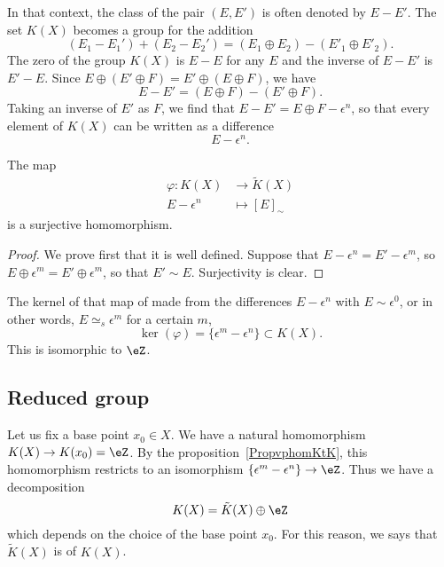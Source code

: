 In that context, the class of the pair $(E,E')$ is often denoted by $E-E'$. The set $K(X)$ becomes a group for the addition
\begin{equation}
(E_1-E_1')+(E_2-E_2')=(E_1\oplus E_2)-(E'_1\oplus E'_2).
\end{equation}
The zero of the group $K(X)$ is $E-E$ for any $E$ and the inverse of $E-E'$ is $E'-E$. Since $E\oplus(E'\oplus F)=E'\oplus(E\oplus F)$, we have
\begin{equation}
E-E'=(E\oplus F)-(E'\oplus F).
\end{equation}
Taking an inverse of $E'$ as $F$, we find that $E-E'=E\oplus F-\epsilon^n$, so that every element of $K(X)$ can be written as a difference
\[
E-\epsilon^n.
\]

\begin{proposition}		\label{PropvphomKtK}
The map
\begin{equation}
\begin{aligned}
 \varphi\colon K(X)&\to \tilde K(X) \\
   E-\epsilon^n&\mapsto [E]_{\sim}
\end{aligned}
\end{equation}
is a surjective homomorphism.
\end{proposition}

\begin{proof}
We prove first that it is well defined. Suppose that $E-\epsilon^n=E'-\epsilon^m$, so $E\oplus \epsilon^m=E'\oplus \epsilon^m$, so that $E'\sim E$. Surjectivity is clear.
\end{proof}

The kernel of that map of made from the differences $E-\epsilon^n$ with $E\sim \epsilon^0$, or in other words, $E\simeq_s\epsilon^m$ for a certain $m$,
\begin{equation}
\ker(\varphi)=\{ \epsilon^m-\epsilon^n \}\subset K(X).
\end{equation}
This is isomorphic to $\eZ$.

					\subsection{Reduced group}

Let us fix a base point $x_0\in X$. We have a natural homomorphism $K(X)\to K(x_0)=\eZ$. By the proposition~\ref{PropvphomKtK}, this homomorphism restricts to an isomorphism $\{ \epsilon^m-\epsilon^n \}\to \eZ$. Thus we have a decomposition
\begin{equation}
		K(X)=\tilde K(X)\oplus\eZ
\end{equation}
which depends on the choice of the base point $x_0$. For this reason, we says that $\tilde K(X)$ is  of $K(X)$.

